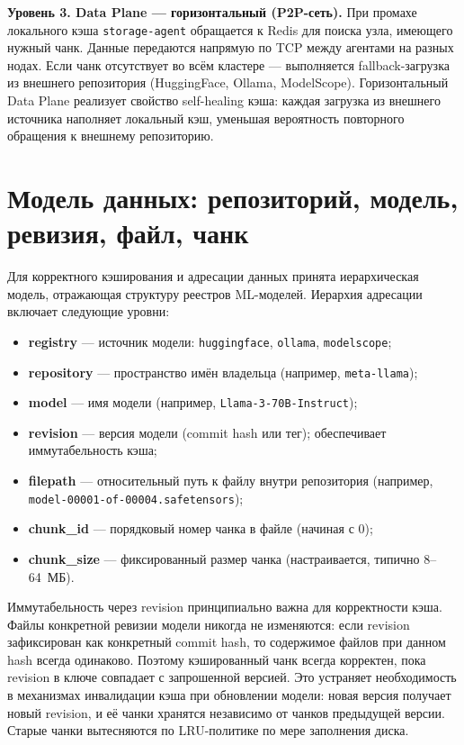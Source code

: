 \textbf{Уровень 3. Data Plane --- горизонтальный (P2P-сеть).} При промахе локального кэша \texttt{storage-agent} обращается к Redis для поиска узла, имеющего нужный чанк. Данные передаются напрямую по TCP между агентами на разных нодах. Если чанк отсутствует во всём кластере --- выполняется fallback-загрузка из внешнего репозитория (HuggingFace, Ollama, ModelScope). Горизонтальный Data Plane реализует свойство self-healing кэша: каждая загрузка из внешнего источника наполняет локальный кэш, уменьшая вероятность повторного обращения к внешнему репозиторию.

\section{Модель данных: репозиторий, модель, ревизия, файл, чанк}

Для корректного кэширования и адресации данных принята иерархическая модель, отражающая структуру реестров ML-моделей. Иерархия адресации включает следующие уровни:

\begin{itemize}[leftmargin=*]
  \item \textbf{registry} --- источник модели: \texttt{huggingface}, \texttt{ollama}, \texttt{modelscope};
  \item \textbf{repository} --- пространство имён владельца (например, \texttt{meta-llama});
  \item \textbf{model} --- имя модели (например, \texttt{Llama-3-70B-Instruct});
  \item \textbf{revision} --- версия модели (commit hash или тег); обеспечивает иммутабельность кэша;
  \item \textbf{filepath} --- относительный путь к файлу внутри репозитория (например, \texttt{model-00001-of-00004.safetensors});
  \item \textbf{chunk\_id} --- порядковый номер чанка в файле (начиная с 0);
  \item \textbf{chunk\_size} --- фиксированный размер чанка (настраивается, типично 8--64~МБ).
\end{itemize}

Иммутабельность через revision принципиально важна для корректности кэша. Файлы конкретной ревизии модели никогда не изменяются: если revision зафиксирован как конкретный commit hash, то содержимое файлов при данном hash всегда одинаково. Поэтому кэшированный чанк всегда корректен, пока revision в ключе совпадает с запрошенной версией. Это устраняет необходимость в механизмах инвалидации кэша при обновлении модели: новая версия получает новый revision, и её чанки хранятся независимо от чанков предыдущей версии. Старые чанки вытесняются по LRU-политике по мере заполнения диска.

